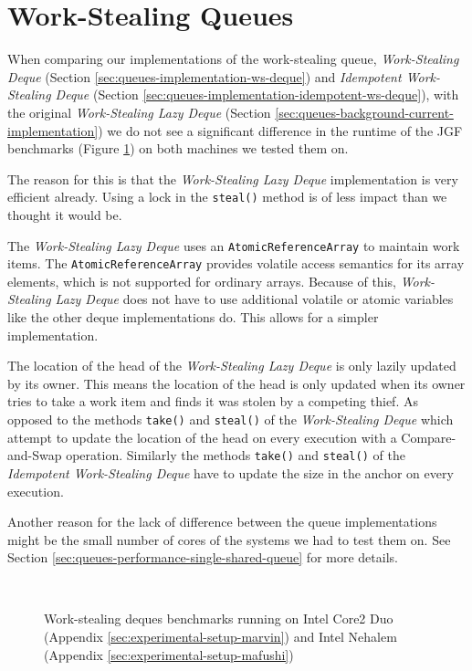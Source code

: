 \section{Work-Stealing Queues}
\label{sec:queues-performance-ws}

When comparing our implementations of the work-stealing queue,
\emph{Work-Stealing Deque} (Section
\ref{sec:queues-implementation-ws-deque}) and \emph{Idempotent
  Work-Stealing Deque} (Section
\ref{sec:queues-implementation-idempotent-ws-deque}), with the
original \emph{Work-Stealing Lazy Deque} (Section
\ref{sec:queues-background-current-implementation}) we do not see a
significant difference in the runtime of the JGF benchmarks (Figure
\ref{fig:queues-performance-deques}) on both machines we tested them
on.

The reason for this is that the \emph{Work-Stealing Lazy Deque}
implementation is very efficient already. Using a lock in the
\lstinline!steal()! method is of less impact than we thought it would
be.

The \emph{Work-Stealing Lazy Deque} uses an
\lstinline!AtomicReferenceArray! to maintain work items. The
\lstinline!AtomicReferenceArray! provides volatile access semantics
for its array elements, which is not supported for ordinary
arrays. Because of this, \emph{Work-Stealing Lazy Deque} does not have
to use additional volatile or atomic variables like the other deque
implementations do. This allows for a simpler implementation.

The location of the head of the \emph{Work-Stealing Lazy Deque} is
only lazily updated by its owner. This means the location of the head
is only updated when its owner tries to take a work item and finds it
was stolen by a competing thief. As opposed to the methods
\lstinline!take()! and \lstinline!steal()!  of the \emph{Work-Stealing
  Deque} which attempt to update the location of the head on every
execution with a Compare-and-Swap operation. Similarly the methods
\lstinline!take()!  and \lstinline!steal()! of the \emph{Idempotent
  Work-Stealing Deque} have to update the size in the anchor on every
execution.

Another reason for the lack of difference between the queue
implementations might be the small number of cores of the systems we
had to test them on. See Section
\ref{sec:queues-performance-single-shared-queue} for more details.

\begin{figure}[!ht]
  \centering
  \\
  \caption[Work-stealing deques benchmark results]{Work-stealing
    deques benchmarks running on Intel Core2 Duo (Appendix
    \ref{sec:experimental-setup-marvin}) and Intel Nehalem (Appendix
    \ref{sec:experimental-setup-mafushi})}
  \label{fig:queues-performance-deques}
\end{figure}


